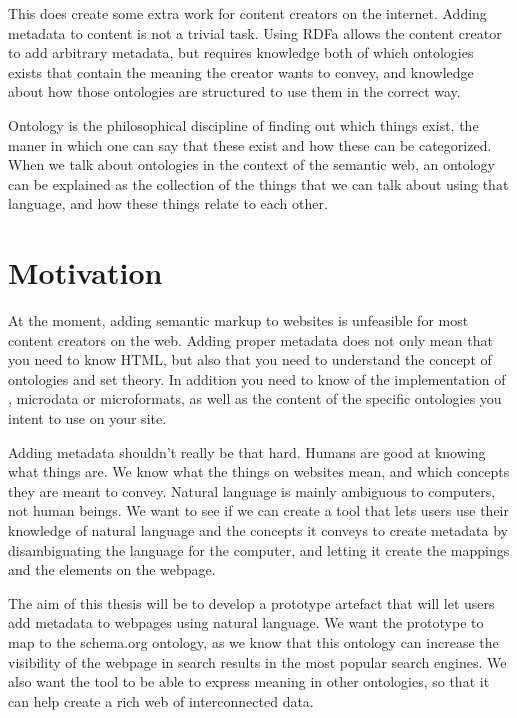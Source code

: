 This does create some extra work for content creators on the internet.
Adding metadata to content is not a trivial task.
Using RDFa allows the content creator to add arbitrary metadata,
but requires knowledge both of which ontologies exists that contain the meaning the creator wants to convey,
and knowledge about how those ontologies are structured to use them in the correct way.


Ontology is the philosophical discipline of finding out which things exist,
the maner in which one can say that these exist and how these can be categorized.
When we talk about ontologies in the context of the semantic web,
an ontology can be explained as the collection of the things that we can talk about using that language,
and how these things relate to each other.


\section{Motivation}
At the moment, adding semantic markup to websites is unfeasible for most content creators on the web.
Adding proper metadata does not only mean that you need to know HTML,
but also that you need to understand the concept of ontologies and set theory.
In addition you need to know of the implementation of , microdata or microformats,
as well as the content of the specific ontologies you intent to use on your site.

Adding metadata shouldn't really be that hard.
Humans are good at knowing what things are.
We know what the things on websites mean, and which concepts they are meant to convey.
Natural language is mainly ambiguous to computers, not human beings.
We want to see if we can create a tool that lets users use their knowledge of natural language and the concepts it conveys
to create metadata by disambiguating the language for the computer, and letting it create the mappings and the elements on the webpage.

The aim of this thesis will be to develop a prototype artefact that will let users add metadata to webpages using natural language.
We want the prototype to map to the schema.org ontology,
as we know that this ontology can increase the visibility of the webpage in search results in the most popular search engines.
We also want the tool to be able to express meaning in other ontologies, so that it can help create a rich web of interconnected data.

